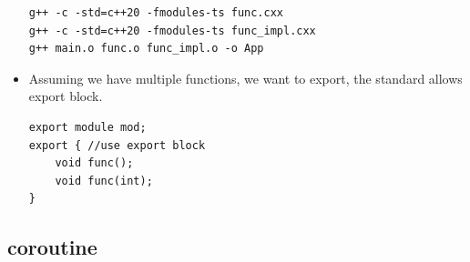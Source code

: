 \documentclass[a4paper,11pt,twoside]{book}
\begin{document}
\begin{itemize}
\begin{lstlisting}
g++ -c -std=c++20 -fmodules-ts func.cxx
g++ -c -std=c++20 -fmodules-ts func_impl.cxx 
g++ main.o func.o func_impl.o -o App
\end{lstlisting}

    \item Assuming we have multiple functions, we want to export, the standard allows export block.

\begin{lstlisting}
export module mod;
export { //use export block
    void func();
    void func(int);
}
\end{lstlisting}

	
\end{itemize}

\subsection{coroutine}
\end{document}
